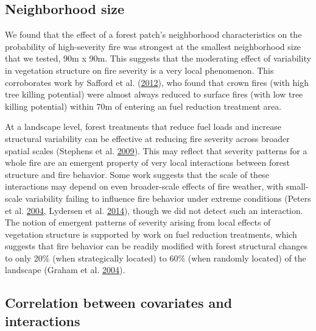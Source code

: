 \documentclass[twoside,12pt,final]{ucthesis-CA2012}
\begin{document}
\begin{ucmainmatter}
\subsection{Neighborhood size}\label{neighborhood-size}

We found that the effect of a forest patch's neighborhood
characteristics on the probability of high-severity fire was strongest
at the smallest neighborhood size that we tested, 90m x 90m. This
suggests that the moderating effect of variability in vegetation
structure on fire severity is a very local phenomenon. This corroborates
work by Safford et al. (\protect\hyperlink{ref-safford2012}{2012}), who
found that crown fires (with high tree killing potential) were almost
always reduced to surface fires (with low tree killing potential) within
70m of entering an fuel reduction treatment area.

At a landscape level, forest treatments that reduce fuel loads and
increase structural variability can be effective at reducing fire
severity across broader spatial scales (Stephens et al.
\protect\hyperlink{ref-stephens2009}{2009}). This may reflect that
severity patterns for a whole fire are an emergent property of very
local interactions between forest structure and fire behavior. Some work
suggests that the scale of these interactions may depend on even
broader-scale effects of fire weather, with small-scale variability
failing to influence fire behavior under extreme conditions (Peters et
al. \protect\hyperlink{ref-peters2004}{2004}, Lydersen et al.
\protect\hyperlink{ref-lydersen2014}{2014}), though we did not detect
such an interaction. The notion of emergent patterns of severity arising
from local effects of vegetation structure is supported by work on fuel
reduction treatments, which suggests that fire behavior can be readily
modified with forest structural changes to only 20\% (when strategically
located) to 60\% (when randomly located) of the landscape (Graham et al.
\protect\hyperlink{ref-graham2004}{2004}).

\subsection{Correlation between covariates and
interactions}\label{correlation-between-covariates-and-interactions}


\end{ucmainmatter}
\end{document}

